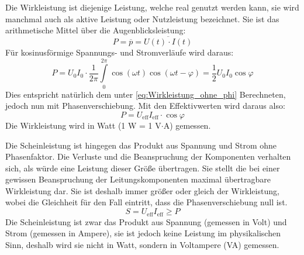 Die Wirkleistung ist diejenige Leistung, welche real genutzt werden kann, sie wird manchmal auch als aktive Leistung oder Nutzleistung bezeichnet. Sie ist das arithmetische Mittel über die Augenblicksleistung:
\begin{equation}
P = \overline{p} = \overline{U(t) \cdot I(t)}
\end{equation}
Für kosinusförmige Spannungs- und Stromverläufe wird daraus:
\begin{equation}
P = U_0 I_0 \cdot \frac{1}{2\pi} \int\limits_0^{2\pi} \cos\left( \omega t\right) \cos \left(\omega t - \varphi\right)
= \frac{1}{2} U_0 I_0 \cos \varphi
\end{equation}
Dies entspricht natürlich dem unter \eqref{eq:Wirkleistung_ohne_phi} Berechneten, jedoch nun mit Phasenverschiebung. Mit den Effektivwerten wird daraus also:
\begin{equation}
P =  U_{\mathrm{eff}} I_{\mathrm{eff}} \cdot \cos \varphi
\end{equation}
Die Wirkleistung wird in Watt (1 W = 1 V$\cdot$A) gemessen.

Die Scheinleistung ist hingegen das Produkt aus Spannung und Strom ohne Phasenfaktor. Die Verluste und die Beanspruchung der Komponenten verhalten sich, als würde eine Leistung dieser Größe übertragen. Sie stellt die bei einer gewissen Beanspruchung der Leitungskomponenten maximal übertragbare Wirkleistung dar. Sie ist deshalb immer größer oder gleich der Wirkleistung, wobei die Gleichheit für den Fall eintritt, dass die Phasenverschiebung null ist.
\begin{equation}
S = U_{\mathrm{eff}} I_{\mathrm{eff}} \geq P
\end{equation}
Die Scheinleistung ist zwar das Produkt aus Spannung (gemessen in Volt) und Strom (gemessen in Ampere), sie ist jedoch keine Leistung im physikalischen Sinn, deshalb wird sie nicht in Watt, sondern in Voltampere (VA) gemessen.

